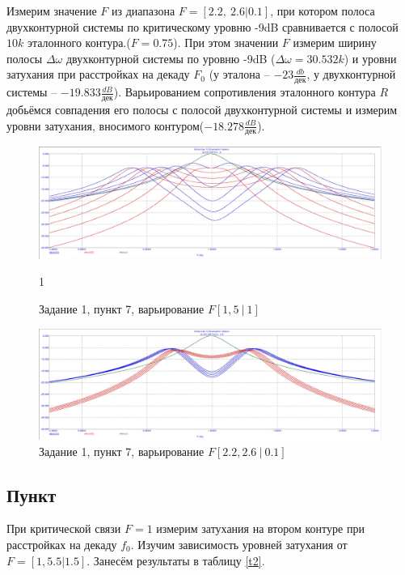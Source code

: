 \documentclass[a4paper, 14pt]{extarticle}%
\begin{document}
Измерим значение $F$ из диапазона $F = [2.2,~2.6|0.1]$, при котором полоса двухконтурной системы по критическому уровню -9dB сравнивается с полосой $10k$ эталонного контура.($F = 0.75$). При этом значении $F$ измерим ширину полосы $\Delta \omega$ двухконтурной системы по уровню -9dB ($\Delta \omega = 30.532k$) и уровни затухания при расстройках на декаду $F_0$ (у эталона -- $-23\frac{db}{\text{дек}}$, у двухконтурной системы -- $-19.833\frac{dB}{\text{дек}}$). Варьированием сопротивления эталонного контура $R$ добьёмся совпадения его полосы с полосой двухконтурной системы и измерим уровни затухания, вносимого контуром($-18.278\frac{dB}{\text{дек}}$).


\begin{figure}[h!]
	\centering
			\includegraphics[width=1.1\linewidth]{1.7varF.jpg}
            \caption{Задание 1,  пункт 7, варьирование $F [1, 5 \: | \: 1]$}
	\label{A}1
\end{figure}


\begin{figure}[h!]
	\centering
			\includegraphics[width=1.1\linewidth]{1.7varF2.jpg}
            \caption{Задание 1,  пункт 7, варьирование $F [2.2, 2.6 \: | \: 0.1]$}
	\label{A}
\end{figure}



\subsection{Пункт}
При критической связи $F = 1$ измерим затухания на втором контуре при расстройках на декаду $f_0$. Изучим зависимость уровней затухания от $F = [1,5.5|1.5]$. Занесём результаты в таблицу \ref{t2}.
\end{document}
